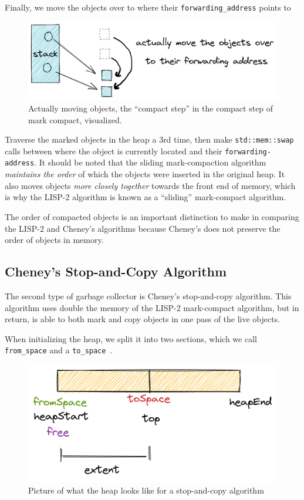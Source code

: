 \documentclass[index]{subfiles}
\begin{document}
Finally, we move the objects over to where their \verb+forwarding_address+ points to

\begin{figure}[H]
    \centering
    \includegraphics[scale=0.25]{pics/actually-move.png}
    \caption{Actually moving objects, the ``compact step'' in the compact step of mark compact, visualized.}
\end{figure}

Traverse the marked objects in the heap a 3rd time, then make \texttt{std::mem::swap} calls between where the object is currently located and their \verb+forwarding-address+. It should be noted that the sliding mark-compaction algorithm \textit{maintains the order} of which the objects were inserted in the original heap. It also moves objects \textit{more closely together} towards the front end of memory, which is why the LISP-2 algorithm is known as a ``sliding'' mark-compact algorithm.

The order of compacted objects is an important distinction to make in comparing the LISP-2 and Cheney's algorithms because Cheney's does not preserve the order of objects in memory.

\subsection{Cheney's Stop-and-Copy Algorithm}

The second type of garbage collector is Cheney's stop-and-copy algorithm. This algorithm uses double the memory of the LISP-2 mark-compact algorithm, but in return, is able to both mark and copy objects in one pass of the live objects.

When initializing the heap, we split it into two sections, which we call \verb+from_space+ and a \verb+to_space+~\parencite[Chapter~2]{gc_handbook}.

\begin{figure}[H]
    \centering
    \includegraphics[scale=0.3]{pics/split-heap-diagram.png}
    \caption{Picture of what the heap looks like for a stop-and-copy algorithm}
\end{figure}
\end{document}
